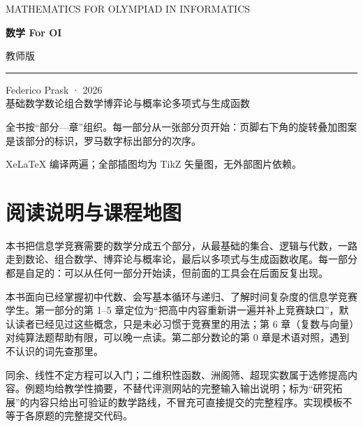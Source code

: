 \documentclass[a4paper,twoside,openright,11pt,fontset=fandol]{ctexbook}
\theoremstyle{definition}
\begin{document}
\frontmatter

\begin{titlepage}
\setlength{\parindent}{0pt}
\vspace*{1.2cm}
{\large\color{accent}MATHEMATICS FOR OLYMPIAD IN INFORMATICS}\par
\vspace{1cm}
{\fontsize{46}{65}\selectfont\bfseries\color{ink}数学 \huge{For OI}}\par
\vspace{0.5cm}
{\Large 教师版}\par
\vspace{0.5cm}
{\color{accent}\rule{\textwidth}{1.2pt}}\par
\vspace{0.3cm}
\begin{minipage}{0.9\textwidth}
\large Federico Prask · 2026\\[0.8em]
\normalsize 基础数学\quad 数论\quad 组合数学\quad 博弈论与概率论\quad 多项式与生成函数
\end{minipage}\par
\vfill
{\small 全书按“部分—章”组织。每一部分从一张部分页开始：页脚右下角的旋转叠加图案是该部分的标识，罗马数字标出部分的次序。}\par
{\small XeLaTeX 编译两遍；全部插图均为 TikZ 矢量图，无外部图片依赖。}\par
\end{titlepage}

\chapter*{阅读说明与课程地图}

\begin{chapterintro}[章节导读]
本书把信息学竞赛需要的数学分成五个部分，从最基础的集合、逻辑与代数，一路走到数论、组合数学、博弈论与概率论，最后以多项式与生成函数收尾。每一部分都是自足的：可以从任何一部分开始读，但前面的工具会在后面反复出现。
\end{chapterintro}

\begin{pitfall}[适用范围与阅读边界]
本书面向已经掌握初中代数、会写基本循环与递归、了解时间复杂度的信息学竞赛学生。第一部分的第 1--5 章定位为“把高中内容重新讲一遍并补上竞赛缺口”，默认读者已经见过这些概念，只是未必习惯于竞赛里的用法；第 6 章（复数与向量）对纯算法题帮助有限，可以晚一点读。第二部分数论的第 0 章是术语对照，遇到不认识的词先查那里。

同余、线性不定方程可以入门；二维积性函数、洲阁筛、超现实数属于选修提高内容。例题均给教学性摘要，不替代评测网站的完整输入输出说明；标为“研究拓展”的内容只给出可验证的数学路线，不冒充可直接提交的完整程序。实现模板不等于各原题的完整提交代码。
\end{pitfall}
\end{document}
